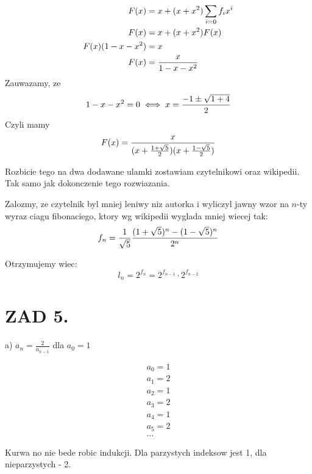 \documentclass{article}[13pt]
\begin{document}
    \begin{align*}
        F(x)&=x+(x+x^2)\sum\limits_{i=0}f_ix^i\\
        F(x)&=x+(x+x^2)F(x)\\
        F(x)(1-x-x^2)&=x\\
        F(x)&={x\over 1-x-x^2}
    \end{align*}
    Zauwazamy, ze 
    $$1-x-x^2=0\iff x={-1\pm\sqrt{1+4}\over 2}$$
    Czyli mamy
    $$F(x)={x\over (x+{1+\sqrt5\over 2})(x+{1-\sqrt5\over 2})}$$

    Rozbicie tego na dwa dodawane ulamki zostawiam czytelnikowi oraz wikipedii. Tak samo jak dokonczenie tego rozwiazania.
    \medskip

    Zalozmy, ze czytelnik byl mniej leniwy niz autorka i wyliczyl jawny wzor na $n$-ty wyraz ciagu fibonaciego, ktory wg wikipedii wyglada mniej wiecej tak:
    $$f_n=\frac1{\sqrt5}{(1+\sqrt5)^n-(1-\sqrt5)^n\over 2^n}$$

    Otrzymujemy wiec:
    $$l_n=2^{f_n}=2^{f_{n-1}}\cdot 2^{f_{n-2}}$$


    \section*{ZAD 5.}

    a) $a_n=\frac 2{a_{n-1}}$ dla $a_0=1$

    \begin{align*}
        a_0=1\\
        a_1=2\\
        a_2=1\\
        a_3=2\\
        a_4=1\\
        a_5=2\\
        ...
    \end{align*}

    Kurwa no nie bede robic indukcji. Dla parzystych indeksow jest 1, dla nieparzystych - 2.
\end{document}
